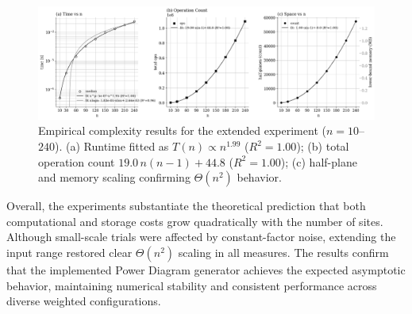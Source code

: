 \documentclass{article}
\begin{document}
\begin{figure}[H]
    \centering
    \includegraphics[width=0.95\linewidth]{Pictures/power_complexity2.png}
    \caption{Empirical complexity results for the extended experiment ($n=10$–$240$). 
    (a) Runtime fitted as $T(n)\!\propto\!n^{1.99}$ ($R^2\!=\!1.00$); 
    (b) total operation count $19.0\,n(n-1)+44.8$ ($R^2\!=\!1.00$); 
    (c) half-plane and memory scaling confirming $\Theta(n^2)$ behavior.}
    \label{fig:power_complexity2}
\end{figure}

Overall, the experiments substantiate the theoretical prediction that both computational and storage costs grow quadratically with the number of sites.  
Although small-scale trials were affected by constant-factor noise, extending the input range restored clear $\Theta(n^2)$ scaling in all measures.  
The results confirm that the implemented Power Diagram generator achieves the expected asymptotic behavior, maintaining numerical stability and consistent performance across diverse weighted configurations.

\setcounter{Psec}{0}
\setcounter{Psubsec}{0}
\newpage
\end{document}
